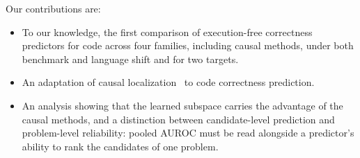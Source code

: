 

Our contributions are:
\begin{itemize}
  \item To our knowledge, the first comparison of execution-free correctness
  predictors for code across four families, including causal methods, under
  both benchmark and language shift and for two targets.
  \item An adaptation of causal localization~\cite{Huang2025Internal} to code
  correctness prediction.
  \item An analysis showing that the learned subspace carries the advantage of
  the causal methods, and a distinction between candidate-level prediction and
  problem-level reliability: pooled AUROC must be read alongside a predictor's
  ability to rank the candidates of one problem.
\end{itemize}

